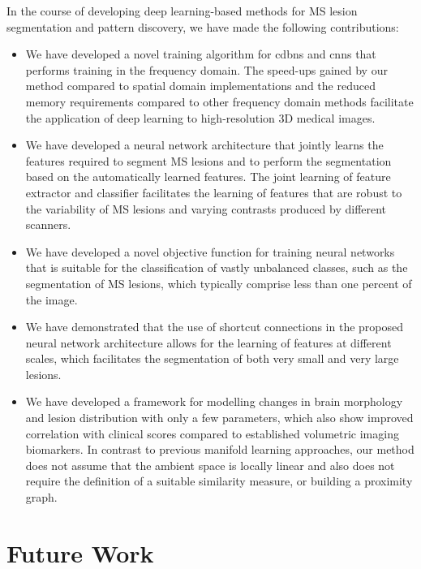 In the course of developing deep learning-based methods for MS lesion
segmentation and pattern discovery, we have made the following contributions:
\begin{itemize}
\item We have developed a novel training algorithm for \glspl{cdbn} and
\glspl{cnn} that performs training in the frequency domain. The speed-ups gained
by our method compared to spatial domain implementations and the reduced memory
requirements compared to other frequency domain methods facilitate the
application of deep learning to high-resolution 3D medical images.
  
\item We have developed a neural network architecture that jointly learns the
features required to segment MS lesions and to perform the segmentation based on
the automatically learned features. The joint learning of feature extractor and
classifier facilitates the learning of features that are robust to the
variability of MS lesions and varying contrasts produced by different scanners.

\item We have developed a novel objective function for training neural networks
that is suitable for the classification of vastly unbalanced classes, such as
the segmentation of MS lesions, which typically comprise less than one percent
of the image.

\item We have demonstrated that the use of shortcut connections in the proposed
neural network architecture allows for the learning of features at different
scales, which facilitates the segmentation of both very small and very large
lesions.

\item We have developed a framework for modelling changes in brain morphology
and lesion distribution with only a few parameters, which also show improved
correlation with clinical scores compared to established volumetric imaging
biomarkers. In contrast to previous manifold learning approaches, our method
does not assume that the ambient space is locally linear and also does not
require the definition of a suitable similarity measure, or building a proximity
graph.
\end{itemize}

\section[Future work]{Future Work}

